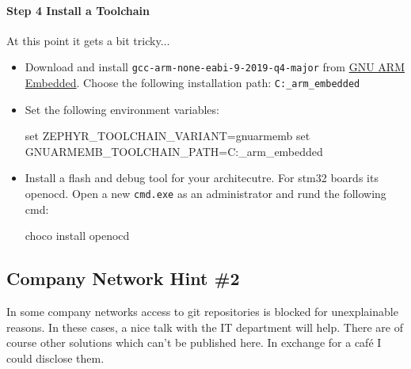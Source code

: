 \paragraph{Step 4 Install a Toolchain}
At this point it gets a bit tricky...
\begin{itemize}
    \item Download and install \texttt{gcc-arm-none-eabi-9-2019-q4-major} from \href{from https://developer.arm.com/tools-and-software/open-source-software/developer-tools/gnu-toolchain/gnu-rm}{GNU ARM Embedded}. Choose the following installation path: \texttt{C:\gnu_arm_embedded}
    \item Set the following environment variables:
    \begin{bashbox}
set ZEPHYR_TOOLCHAIN_VARIANT=gnuarmemb
set GNUARMEMB_TOOLCHAIN_PATH=C:\gnu_arm_embedded
    \end{bashbox}
    \item Install a flash and debug tool for your architecutre. For stm32 boards its openocd. 
    Open a new \texttt{cmd.exe} as an administrator and rund the following cmd:
    \begin{bashbox}    
choco install openocd
    \end{bashbox}
\end{itemize}


\subsection{Company Network Hint \#2}

In some company networks access to git repositories is blocked for unexplainable reasons. In these cases, a nice talk with the IT department will help. There are of course other solutions which can't be published here. In exchange for a café I could disclose them.
